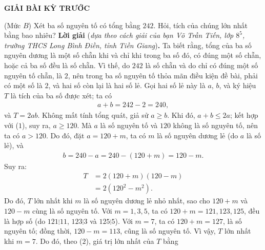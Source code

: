 \newpage
	\begin{center}
		{\large{\textbf{\color{thachthuctoanhoc}GIẢI BÀI KỲ TRƯỚC}}}
	\end{center}
\begin{multicols}{2}
	\setlength{\abovedisplayskip}{4pt}
	\setlength{\belowdisplayskip}{4pt}
	{}
	(Mức $B$) Xét ba số nguyên tố có tổng bằng $242$. Hỏi,  tích của chúng lớn nhất bằng bao nhiêu?
	\vskip 0.05cm
	\textbf{\color{thachthuctoanhoc}Lời giải} (\textit{dựa theo cách giải của bạn Võ Trần Tiến, lớp $8^5$, trường THCS Long Bình Điền, tỉnh Tiền Giang})\textbf{\color{thachthuctoanhoc}.}
	\vskip 0.05cm
	Ta biết rằng, tổng của ba số nguyên dương là một số chẵn khi và chỉ khi trong ba số đó, có đúng một số chẵn, hoặc cả ba số đều là số chẵn. Vì thế, do $242$ là số chẵn và do chỉ có đúng một số nguyên tố chẵn, là $2$, nên trong ba số nguyên tố thỏa mãn điều kiện đề bài, phải có một số là $2$, và hai số còn lại là hai số lẻ. Gọi hai số lẻ này là $a$, $b$, và ký hiệu $T$ là tích của ba số được xét; ta có
	\begin{align*}
		a + b = 242 - 2 = 240,                          \tag{$1$}
	\end{align*}
	và $T = 2ab$.
	\vskip 0.05cm
	Không mất tính tổng quát, giả sử $a \ge b$. Khi đó, $a + b \le 2a$; kết hợp với ($1$), suy ra, $a \ge 120$. Mà $a$ là số nguyên tố và $120$ không là số nguyên tố, nên ta có $a > 120$. Do đó, đặt $a = 120 + m$, ta có $m$ là số nguyên dương lẻ (do $a$ là số lẻ), và
	\begin{align*}
		b = 240 - a = 240 - (120 + m) = 120 - m.
	\end{align*}
	Suy ra:
	\begin{align*}
		T &= 2\left( {120 + m} \right)\left( {120 - m} \right) \\
		&= 2\left( {{{120}^2} - {m^2}} \right). \tag{$2$}
	\end{align*}
	Do đó, $T$ lớn nhất khi $m$ là số nguyên dương lẻ nhỏ nhất, sao cho $120 + m$ và $120 - m$ cùng là số nguyên tố.
	\vskip 0.05cm
	Với $m \!=\! 1, 3, 5$, ta có $120 \!+\! m \!=\! 121, 123, 125$, đều là hợp số (do  $121 \vdots 11$, $123  \vdots  3$  và  $125 \vdots 5$).
	\vskip 0.05cm
	Với $m = 7$, ta có $120 + m = 127$, là số nguyên tố; đồng thời, $120 - m = 113$, cũng là số nguyên tố.
	\vskip 0.05cm
	Vì vậy, $T$ lớn nhất khi $m = 7$. Do đó, theo ($2$), giá trị lớn nhất của $T$ bằng

\end{multicols}
